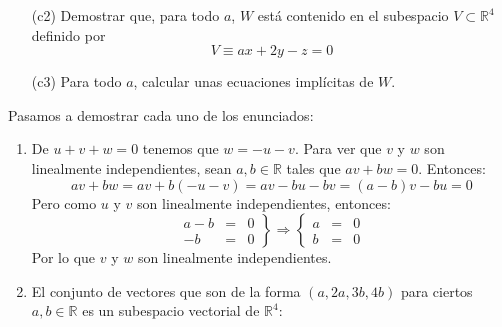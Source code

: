 \documentclass[12pt]{article}
\begin{document}
\begin{ejercicio}[5 puntos]
\begin{enumerate}[label=\alph*)]
\begin{enumerate}
                    \item[(c2)] Demostrar que, para todo $a$, $W$ está contenido en el subespacio $V\subset\mathbb{R}^4$ definido por 
                        \begin{equation*}
                            V\equiv ax+2y-z=0
                        \end{equation*}
                    \item[(c3)] Para todo $a$, calcular unas ecuaciones implícitas de $W$.
                \end{enumerate}
        \end{enumerate}
    \end{ejercicio}

    \newpage
    \setcounter{ejercicio}{0}

    \begin{ejercicio}
        Pasamos a demostrar cada uno de los enunciados:
        \begin{enumerate}[label=\alph*)]
            \item De $u+v+w = 0$ tenemos que $w = -u-v$. Para ver que $v$ y $w$ son linealmente independientes, sean $a,b\in \mathbb{R}$ tales que $av+bw = 0$. Entonces:
                \begin{equation*}
                    av + bw = av + b(-u-v) = av -bu -bv = (a-b)v -bu = 0
                \end{equation*}
                Pero como $u$ y $v$ son linealmente independientes, entonces:
                \begin{equation*}
                    \left.\begin{array}{rcl}
                            a-b &=& 0 \\
                            -b &=& 0
                    \end{array}\right\} \Longrightarrow 
                    \left\{\begin{array}{rlc}
                            a &=& 0 \\
                            b &=& 0 
                    \end{array}\right.
                \end{equation*}
                Por lo que $v$ y $w$ son linealmente independientes.
            \item El conjunto de vectores que son de la forma $(a,2a,3b,4b)$ para ciertos $a,b\in \mathbb{R}$ es un subespacio vectorial de $\mathbb{R}^4$:
                \begin{equation*}

\end{equation*}
\end{enumerate}
\end{ejercicio}
\end{document}
